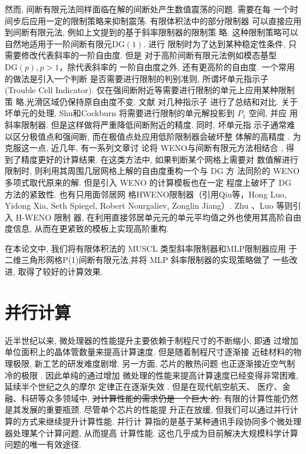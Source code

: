 然而, 间断有限元法同样面临在解的间断处产生数值震荡的问题. 需要在每
一个时间步后应用一定的限制策略来抑制震荡. 有限体积法中的部分限制器
可以直接应用到间断有限元法, 例如上文提到的基于斜率限制器的限制策
略. 这种限制策略可以自然地适用于一阶间断有限元$\text{DG}(1)$. 进行
限制时为了达到某种稳定性条件, 只需要修改代表斜率的一阶自由度. 但是
对于高阶间断有限元法例如模态基型 $\text{DG}(p), p>1$，除代表斜率的
一阶自由度之外, 还有更高阶的自由度.  一个常用的做法是引入一个判断
是否需要进行限制的判别准则, 所谓坏单元指示子 (Trouble Cell
Indicator). 仅在强间断附近等需要进行限制的单元上应用某种限制策
略,光滑区域仍保持原自由度不变.  文献 \cite{Qiu2005b} 对几种指示子
进行了总结和对比. 关于坏单元的处理, Shu和Cockburn
\cite{Cockburn1998}将需要进行限制的单元解投影到 $P_{1}$ 空间, 并应
用斜率限制器. 但是这样做将严重降低间断附近的精度.  同时, 坏单元指
示子通常难以区分极值点和强间断, 而在极值点处应用低阶限制器会破坏整
体解的高精度 \cite{Luo2007}. 为克服这一点, 近几年, 有一系列文章讨
论将 WENO与间断有限元方法相结合 \cite{Zhu2008,Zhu2013,Qiu2005a},
得到了精度更好的计算结果.  在这类方法中, 如果判断某个网格上需要对
数值解进行限制时, 则利用其周围几层网格上解的自由度重构一个与 DG 方
法同阶的 WENO多项式取代原来的解. 但是引入 WENO 的计算模板也在一定
程度上破坏了 DG 方法的紧致性. {\color{red}也有只用面邻居网
  格HWENO限制器（引用Qiu等，Hong Luo, Yidong Xia, Seth Spiegel,
  Robert Nourgaliev, Zonglin Jiang）}. {\color{blue} Zhu
  \cite{Zhu2009} 、Luo \cite{Luo2007,Luo2013} 等则引入 H-WENO 限制
  器, 在利用直接邻居单元元的单元平均值之外也使用其高阶自由度信息,
  从而在更紧致的模板上实现高阶重构.}

在本论文中, 我们将有限体积法的 MUSCL 类型斜率限制器和MLP限制器应用
于二维三角形网格P(1)间断有限元法,并将 MLP 斜率限制器的实现策略做了
一些改进, 取得了较好的计算效果.

\section{并行计算}
\label{sec:parallel}

近半世纪以来, 微处理器的性能提升主要依赖于制程尺寸的不断缩小, 即通
过增加单位面积上的晶体管数量来提高计算速度. 但是随着制程尺寸逐渐接
近硅材料的物理极限, 新工艺的研发难度剧增. 另一方面, 芯片的散热问题
也正逐渐接近空气制冷的极限 \cite{Pacheco2011}. 因此单纯的通过增加
微处理的性能来提高计算速度已经变得非常困难, 延续半个世纪之久的摩尔
定律正在逐渐失效 \cite{Moore1998,Waldrop2016}. 但是在现代航空航天、
医疗、金融、科研等众多领域中, \sout{对计算性能的需求仍是一个巨大
  的.} 有限的计算性能仍然是其发展的重要瓶颈. 尽管单个芯片的性能提
升正在放缓, 但我们可以通过并行计算的方式来继续提升计算性能. 并行计
算指的是基于某种通讯手段协同多个微处理器处理某个计算问题, 从而提高
计算性能. 这也几乎成为目前解决大规模科学计算问题的唯一有效途径.

